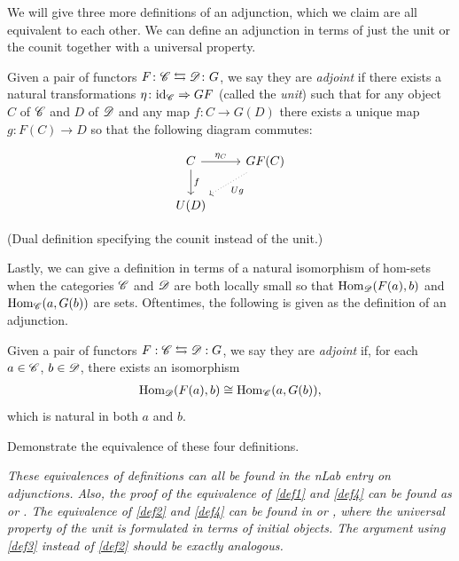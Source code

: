 \documentclass{article}[11pt]
\begin{document}
We will give three more definitions of an adjunction, which we claim are all equivalent to each other. We can define an adjunction in terms of just the unit or the counit together with a universal property.

\begin{definition}\label{def2}
Given a pair of functors $F\colon \mathscr{C} \leftrightarrows \mathscr{D}\colon G$, we say they are \textit{adjoint} if there exists a natural transformations $\eta \colon \text{id}_{\mathscr{C}} \Rightarrow GF$ (called the \textit{unit}) such that for any object $C$ of $\mathscr{C}$ and $D$ of $\mathscr{D}$ and any map $f\colon C\to G(D)$ there exists a unique map $g \colon F(C) \to D$ so that the following diagram commutes:

\[\begin{tikzcd}
C \arrow{d}{f} \arrow{r}{\eta_C} &GF(C) \arrow[dotted]{dl}{Ug}\\
U(D)  & 
\end{tikzcd}\]
\end{definition} 

\begin{definition}\label{def3}
(Dual definition specifying the counit instead of the unit.)
\end{definition} 

Lastly, we can give a definition in terms of a natural isomorphism of hom-sets when the categories $\mathscr{C}$ and $\mathscr{D}$ are both locally small so that $\textup{Hom}_{\mathscr{D}}(F(a),b)$ and $\textup{Hom}_{\mathscr{C}}(a,G(b))$ are sets. Oftentimes, the following is given as the definition of an adjunction.

\begin{definition}\label{def4} Given a pair of functors $F: \mathscr{C} \leftrightarrows \mathscr{D}:G$, we say they are \textit{adjoint} if, for each $a\in \mathscr{C}$, $b\in\mathscr{D}$, there exists an isomorphism
\begin{align*}
	\textup{Hom}_{\mathscr{D}}(F(a), b) \cong \textup{Hom}_{\mathscr{C}} (a, G(b)),
\end{align*}
which is natural in both $a$ and $b$.
\end{definition}

\begin{exercise} Demonstrate the equivalence of these four definitions. 
\end{exercise}
\emph{These equivalences of definitions can all be found in the nLab entry on adjunctions. Also, the proof of the equivalence of \autoref{def1} and \autoref{def4} can be found as  \cite[Theorem 2.2.5]{leinster} or \cite[Theorem 3.9]{mehrle}. The equivalence of \autoref{def2} and \autoref{def4} can be found in \cite[Section 3]{henderson} or \cite[Theorem 2.3.6.]{leinster}, where the universal property of the unit is formulated in terms of initial objects. The argument using \autoref{def3} instead of \autoref{def2} should be exactly analogous.}
\end{document}

